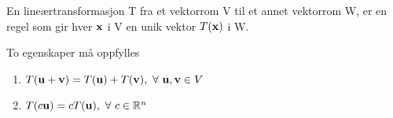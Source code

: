 En lineærtransformasjon T fra et vektorrom V til et annet vektorrom W,
er en regel som gir hver $\mathbf{x}$ i V en unik vektor $T(\mathbf{x})$ i W.

To egenskaper må oppfylles
\begin{enumerate}
  \item $T(\vecu+\vecv) = T(\vecu)+T(\vecv),\ \forall\ \vecu,\vecv\in V$
  \item $T(c\vecu) = cT(\vecu),\ \forall\ c\in\mathbb{R}^n$
\end{enumerate}

